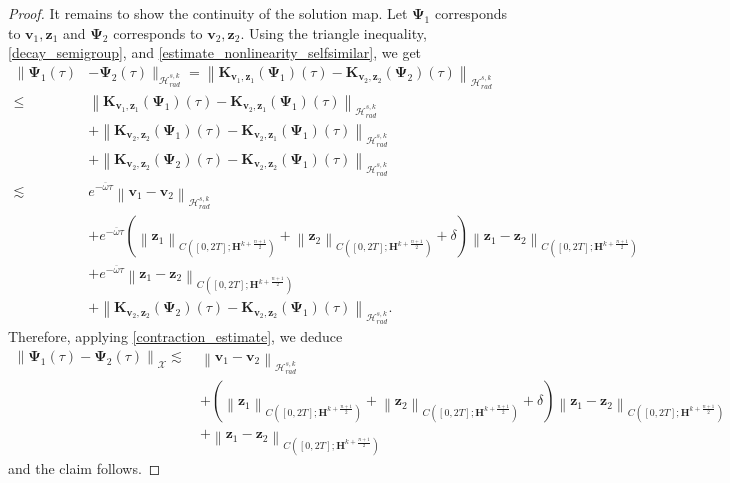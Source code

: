 \documentclass[10pt,a4paper]{amsart}
\newcommand{\HH}{\mathcal{H}}
\newcommand{\norm}[1]{\left\|#1\right\|}
\begin{document}
\begin{proof}
		It remains to show the continuity of the solution map. Let $\mathbf{\Psi}_1$ corresponds to $\mathbf{v}_1,\mathbf{z}_1$ and $\mathbf{\Psi}_2$ corresponds to $\mathbf{v}_2,\mathbf{z}_2$. Using the triangle inequality, \eqref{decay_semigroup}, and \eqref{estimate_nonlinearity_selfsimilar}, we get
		\begin{align*}
			\|\mathbf{\Psi}_1(\tau)&-\mathbf{\Psi}_2(\tau)\|_{\HH_{rad}^{s,k}}= \norm{\mathbf{K}_{\mathbf{v}_1,\mathbf{z}_1}(\mathbf{\Psi}_1)(\tau)-\mathbf{K}_{\mathbf{v}_2,\mathbf{z}_2}(\mathbf{\Psi}_2)(\tau)}_{\HH_{rad}^{s,k}}\\ \leq \ & \norm{\mathbf{K}_{\mathbf{v}_1,\mathbf{z}_1}(\mathbf{\Psi}_1)(\tau)-\mathbf{K}_{\mathbf{v}_2,\mathbf{z}_1}(\mathbf{\Psi}_1)(\tau)}_{\HH_{rad}^{s,k}}\\ & +\norm{\mathbf{K}_{\mathbf{v}_2,\mathbf{z}_2}(\mathbf{\Psi}_1)(\tau)-\mathbf{K}_{\mathbf{v}_2,\mathbf{z}_1}(\mathbf{\Psi}_1)(\tau)}_{\HH_{rad}^{s,k}}\\ &+\norm{\mathbf{K}_{\mathbf{v}_2,\mathbf{z}_2}(\mathbf{\Psi}_2)(\tau)-\mathbf{K}_{\mathbf{v}_2,\mathbf{z}_2}(\mathbf{\Psi}_1)(\tau)}_{\HH_{rad}^{s,k}}\\  \lesssim \ & e^{-\overline{\omega} \tau}\norm{\mathbf{v}_1-\mathbf{v}_2}_{\HH_{rad}^{s,k}}\\ &+ e^{-\overline{\omega} \tau}\left(\norm{\mathbf{z}_1}_{C([0,2T];\mathbf{H}^{k+\frac{n+1}{2}})}+\norm{\mathbf{z}_2}_{C([0,2T];\mathbf{H}^{k+\frac{n+1}{2}})}+\delta\right) \norm{\mathbf{z}_1-\mathbf{z}_2}_{C([0,2T];\mathbf{H}^{k+\frac{n+1}{2}})}\\ & +e^{-\overline{\omega} \tau} \norm{\mathbf{z}_1-\mathbf{z}_2}_{C([0,2T];\mathbf{H}^{k+\frac{n+1}{2}})}\\ &+\norm{\mathbf{K}_{\mathbf{v}_2,\mathbf{z}_2}(\mathbf{\Psi}_2)(\tau)-\mathbf{K}_{\mathbf{v}_2,\mathbf{z}_2}(\mathbf{\Psi}_1)(\tau)}_{\HH_{rad}^{s,k}}.
		\end{align*}
		Therefore, applying \eqref{contraction_estimate}, we deduce
		\begin{align*}
			\norm{\mathbf{\Psi}_1(\tau)-\mathbf{\Psi}_2(\tau)}_{\mathcal{X}}\lesssim \ & \norm{\mathbf{v}_1-\mathbf{v}_2}_{\HH_{rad}^{s,k}}\\ &+ \left(\norm{\mathbf{z}_1}_{C([0,2T];\mathbf{H}^{k+\frac{n+1}{2}})}+\norm{\mathbf{z}_2}_{C([0,2T];\mathbf{H}^{k+\frac{n+1}{2}})}+\delta\right) \norm{\mathbf{z}_1-\mathbf{z}_2}_{C([0,2T];\mathbf{H}^{k+\frac{n+1}{2}})}\\ & +\norm{\mathbf{z}_1-\mathbf{z}_2}_{C([0,2T];\mathbf{H}^{k+\frac{n+1}{2}})}
		\end{align*}
		and the claim follows.
	\end{proof}
\end{document}
